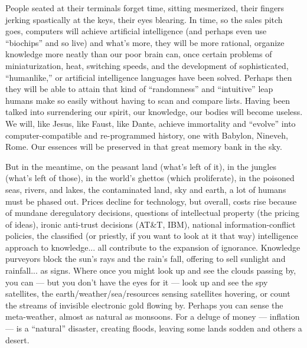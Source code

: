 People seated at their terminals forget
time, sitting mesmerized, their fingers jerking 
spastically at the keys, their eyes blearing.
In time, so the sales pitch goes, computers 
will achieve artificial intelligence (and
perhaps even use \enquote{biochips} and so live)
and what's more, they will be more rational,
organize knowledge more neatly than our
poor brain can, once certain problems of
miniaturization, heat, switching speeds, and
the development of sophisticated, \enquote{humanlike,} 
or artificial intelligence languages
have been solved. Perhaps then they will be
able to attain that kind of \enquote{randomness} and
\enquote{intuitive} leap humans make so easily without 
having to scan and compare lists. Having
been talked into surrendering our spirit, our
knowledge, our bodies will become useless.
We will, like Jesus, like Faust, like Dante,
achieve immortality and \enquote{evolve} into computer-compatible 
and re-programmed history, one with Babylon, Nineveh, Rome.
Our essences will be preserved in that great
memory bank in the sky.

But in the meantime, on the peasant land
(what's left of it), in the jungles (what's left
of those), in the world's ghettos (which
proliferate), in the poisoned seas, rivers,
and lakes, the contaminated land, sky and
earth, a lot of humans must be phased out.
Prices decline for technology, but overall,
costs rise because of mundane deregulatory
decisions, questions of intellectual property
(the pricing of ideas), ironic anti-trust decisions (AT\&T, IBM), national information-conflict policies, the classified (or priestly, if
you want to look at it that way) intelligence
approach to knowledge... all contribute to
the expansion of ignorance. Knowledge purveyors block the sun's rays and the rain's
fall, offering to sell sunlight and rainfall...
as signs. Where once you might look up and
see the clouds passing by, you can --- but you
don't have the eyes for it --- look up and see
the spy satellites, the earth/weather/sea/resources sensing satellites hovering, or count
the streams of invisible electronic gold flowing by. Perhaps
you can sense the meta-weather, almost as natural as monsoons. For
a deluge of money --- inflation --- is a \enquote{natural} disaster, creating floods, leaving some
lands sodden and others a desert.

